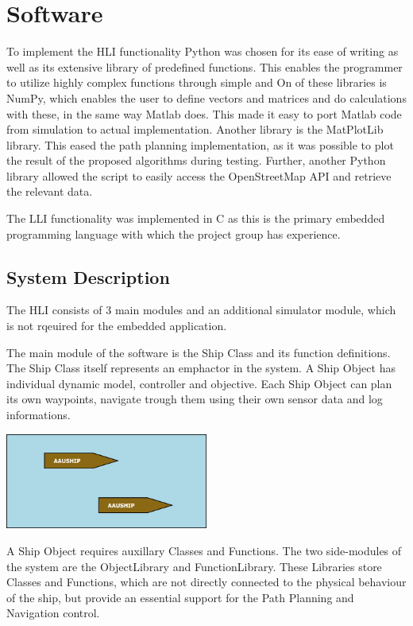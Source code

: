 \chapter{Software}

To implement the HLI functionality Python was chosen for its ease of writing as well as its extensive library of predefined functions. This enables the programmer to utilize highly complex functions through simple and  On of these libraries is NumPy, which enables the user to define vectors and matrices and do calculations with these, in the same way Matlab does. This made it easy to port Matlab code from simulation to actual implementation. Another library is the MatPlotLib library. This eased the path planning implementation, as it was possible to plot the result of the proposed algorithms during testing. Further, another Python library allowed the script to easily access the OpenStreetMap API and retrieve the relevant data.

The LLI functionality was implemented in C as this is the primary embedded programming language with which the project group has experience.

\section{System Description}

The HLI consists of 3 main modules and an additional simulator module, which is not rqeuired for the embedded application.

The main module of the software is the Ship Class and its function definitions.
The Ship Class itself represents an emph{actor} in the system. A Ship Object has individual dynamic model, controller and objective. Each Ship Object can plan its own waypoints, navigate trough them using their own sensor data and log informations.

\begin{center}
\includegraphics[width = 0.5\textwidth]{img/HLIFigures/ActorModel/Actor-model0.png}
\end{center}

A Ship Object requires auxillary Classes and Functions. The two side-modules of the system are the ObjectLibrary and FunctionLibrary. These Libraries store Classes and Functions, which are not directly connected to the physical behaviour of the ship, but provide an essential support for the Path Planning and Navigation control.


